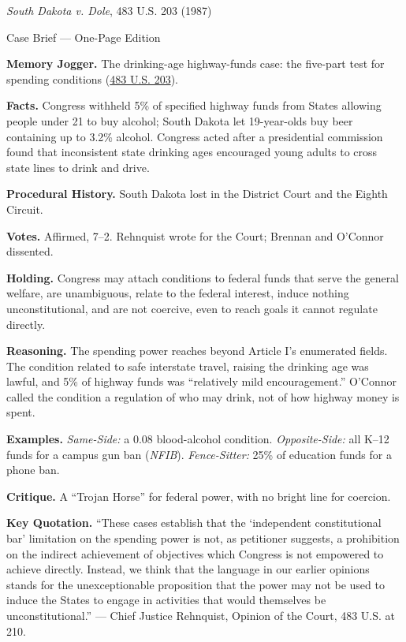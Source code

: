 \documentclass[12pt]{article}
\begin{document}
\begin{center}
{\Large \textit{South Dakota v. Dole}, 483 U.S. 203 (1987)\par}
\vspace{0.3em}
{\normalsize Case Brief --- One-Page Edition\par}
\end{center}

\textbf{Memory Jogger.} The drinking-age highway-funds case: the five-part test for spending conditions (\href{https://supreme.justia.com/cases/federal/us/483/203/}{483 U.S. 203}).

\textbf{Facts.} Congress withheld 5\% of specified highway funds from States allowing people under 21 to buy alcohol; South Dakota let 19-year-olds buy beer containing up to 3.2\% alcohol. Congress acted after a presidential commission found that inconsistent state drinking ages encouraged young adults to cross state lines to drink and drive.

\textbf{Procedural History.} South Dakota lost in the District Court and the Eighth Circuit.

\textbf{Votes.} Affirmed, 7--2. Rehnquist wrote for the Court; Brennan and O'Connor dissented.

\textbf{Holding.} Congress may attach conditions to federal funds that serve the general welfare, are unambiguous, relate to the federal interest, induce nothing unconstitutional, and are not coercive, even to reach goals it cannot regulate directly.

\textbf{Reasoning.} The spending power reaches beyond Article I's enumerated fields. The condition related to safe interstate travel, raising the drinking age was lawful, and 5\% of highway funds was ``relatively mild encouragement.'' O'Connor called the condition a regulation of who may drink, not of how highway money is spent.

\textbf{Examples.} \emph{Same-Side:} a 0.08 blood-alcohol condition. \emph{Opposite-Side:} all K--12 funds for a campus gun ban (\textit{NFIB}). \emph{Fence-Sitter:} 25\% of education funds for a phone ban.

\textbf{Critique.} A ``Trojan Horse'' for federal power, with no bright line for coercion.

\textbf{Key Quotation.} ``These cases establish that the `independent constitutional bar' limitation on the spending power is not, as petitioner suggests, a prohibition on the indirect achievement of objectives which Congress is not empowered to achieve directly. Instead, we think that the language in our earlier opinions stands for the unexceptionable proposition that the power may not be used to induce the States to engage in activities that would themselves be unconstitutional.'' --- Chief Justice Rehnquist, Opinion of the Court, 483 U.S. at 210.
\end{document}
